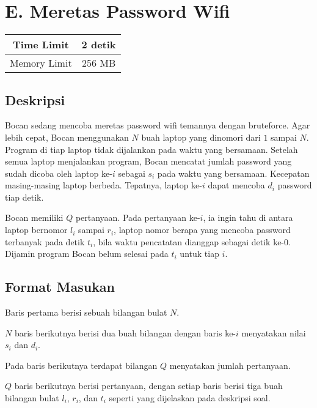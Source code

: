 \documentclass{article}
\begin{document}
\section*{\hfil E. Meretas Password Wifi\hfil}

\begin{center}
\begin{tabular}{ |cc| } 
 \hline
 Time Limit & 2 detik \\
 \hline 
 Memory Limit & 256 MB \\
 \hline
\end{tabular}
\end{center}

\subsection*{Deskripsi}

\par\noindent Bocan sedang mencoba meretas password wifi temannya dengan bruteforce. Agar lebih cepat, Bocan menggunakan $N$ buah laptop yang dinomori dari $1$ sampai $N$. Program di tiap laptop tidak dijalankan pada waktu yang bersamaan. Setelah semua laptop menjalankan program, Bocan mencatat jumlah password yang sudah dicoba oleh laptop ke-$i$ sebagai $s_i$ pada waktu yang bersamaan. Kecepatan masing-masing laptop berbeda. Tepatnya, laptop ke-$i$ dapat mencoba $d_i$ password tiap detik.

\par\noindent Bocan memiliki $Q$ pertanyaan. Pada pertanyaan ke-$i$, ia ingin tahu di antara laptop bernomor $l_i$ sampai $r_i$, laptop nomor berapa yang mencoba password terbanyak pada detik $t_i$, bila waktu pencatatan dianggap sebagai detik ke-$0$. Dijamin program Bocan belum selesai pada $t_i$ untuk tiap $i$.

\subsection*{Format Masukan}

\par\noindent Baris pertama berisi sebuah bilangan bulat $N$.
\par\noindent $N$ baris berikutnya berisi dua buah bilangan dengan baris ke-$i$ menyatakan nilai $s_i$ dan $d_i$.
\par\noindent Pada baris berikutnya terdapat bilangan $Q$ menyatakan jumlah pertanyaan.
\par\noindent $Q$ baris berikutnya berisi pertanyaan, dengan setiap baris berisi tiga buah bilangan bulat $l_i$, $r_i$, dan $t_i$ seperti yang dijelaskan pada deskripsi soal.
\end{document}
